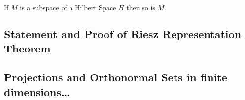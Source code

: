 \begin{exercise}
    If $M$ is a subspace of a Hilbert Space $H$ then so is $\overline M$.
\end{exercise}
\subsection{Statement and Proof of Riesz Representation Theorem}


\subsection{Projections and Orthonormal Sets in finite dimensions\ldots}
